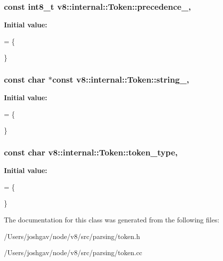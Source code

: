 \subsubsection[{\texorpdfstring{precedence\+\_\+}{precedence_}}]{\setlength{\rightskip}{0pt plus 5cm}const int8\+\_\+t v8\+::internal\+::\+Token\+::precedence\+\_\+\hspace{0.3cm}{\ttfamily [static]}, {\ttfamily [private]}}\hypertarget{classv8_1_1internal_1_1_token_a9673c50344137cd57117675ed77ec1c0}{}\label{classv8_1_1internal_1_1_token_a9673c50344137cd57117675ed77ec1c0}
{\bfseries Initial value\+:}
\begin{DoxyCode}
= \{

\}
\end{DoxyCode}
\subsubsection[{\texorpdfstring{string\+\_\+}{string_}}]{\setlength{\rightskip}{0pt plus 5cm}const char $\ast$const v8\+::internal\+::\+Token\+::string\+\_\+\hspace{0.3cm}{\ttfamily [static]}, {\ttfamily [private]}}\hypertarget{classv8_1_1internal_1_1_token_ae732b7f502b3985b3a0299327e2549ee}{}\label{classv8_1_1internal_1_1_token_ae732b7f502b3985b3a0299327e2549ee}
{\bfseries Initial value\+:}
\begin{DoxyCode}
= \{

\}
\end{DoxyCode}
\subsubsection[{\texorpdfstring{token\+\_\+type}{token_type}}]{\setlength{\rightskip}{0pt plus 5cm}const char v8\+::internal\+::\+Token\+::token\+\_\+type\hspace{0.3cm}{\ttfamily [static]}, {\ttfamily [private]}}\hypertarget{classv8_1_1internal_1_1_token_a805d54bffccf296770f0a364bffd60ad}{}\label{classv8_1_1internal_1_1_token_a805d54bffccf296770f0a364bffd60ad}
{\bfseries Initial value\+:}
\begin{DoxyCode}
= \{

\}
\end{DoxyCode}


The documentation for this class was generated from the following files\+:\begin{DoxyCompactItemize}
\item 
/\+Users/joshgav/node/v8/src/parsing/token.\+h\item 
/\+Users/joshgav/node/v8/src/parsing/token.\+cc\end{DoxyCompactItemize}
